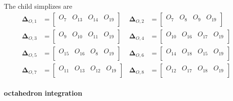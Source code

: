 \documentclass{mitschrift}
\newcommand{\simplex}{\boldsymbol{\Delta}}
\begin{document}
The child simplizes are \begin{align}
    \simplex_{O,1} &= \begin{bmatrix}
        O_7 & O_{13} & O_{14} & O_{19} \\
    \end{bmatrix} & \simplex_{O,2} &= \begin{bmatrix}
        O_7 & O_{8} & O_{9} & O_{19} \\
    \end{bmatrix} \\
    \simplex_{O,3} &= \begin{bmatrix}
        O_9 & O_{10} & O_{11} & O_{19} \\
    \end{bmatrix} & \simplex_{O,4} &= \begin{bmatrix}
        O_{10} & O_{16} & O_{17} & O_{19} \\
    \end{bmatrix} \\
    \simplex_{O,5} &= \begin{bmatrix}
        O_{15} & O_{16} & O_{8} & O_{19} \\
    \end{bmatrix} & \simplex_{O,6} &= \begin{bmatrix}
        O_{14} & O_{18} & O_{15} & O_{19} \\
    \end{bmatrix} \\
    \simplex_{O,7} &= \begin{bmatrix}
        O_{11} & O_{13} & O_{12} & O_{19} \\
    \end{bmatrix} & \simplex_{O,8} &= \begin{bmatrix}
        O_{12} & O_{17} & O_{18} & O_{19} \\
    \end{bmatrix}
\end{align}

\paragraph{octahedron integration}
\end{document}
